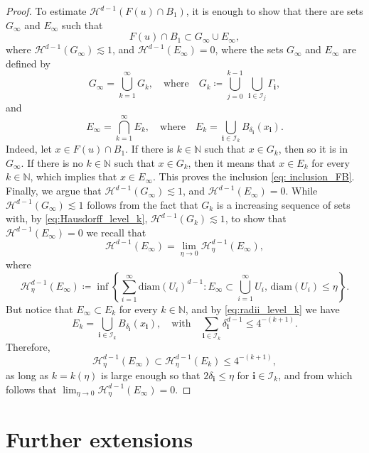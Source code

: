 \documentclass[reqno,11pt]{amsart}
\newcommand{\1}{\mathds{1}}  %
\numberwithin{equation}{section}
\begin{document}
\begin{proof}
To estimate $\mathcal H^{d-1}(F(u)\cap B_1)$, it is enough to show that there are sets $G_\infty$ and $E_\infty$ such that
\begin{equation}\label{eq: inclusion_FB}
    F(u) \cap B_1 \subset G_\infty \cup E_\infty,
\end{equation}
where $\mathcal{H}^{d-1}(G_\infty) \lesssim 1$, and $\mathcal{H}^{d-1}(E_\infty) = 0$, where the sets $G_\infty$ and $E_\infty$ are defined by
\[
    G_\infty = \bigcup_{k=1}^\infty G_k, \quad \text{where} \quad G_k \coloneqq \bigcup_{j=0}^{k-1}\ \bigcup_{\mathbf i\in\mathcal I_j}\Gamma_{\mathbf i},
\]
and
\[
    E_\infty = \bigcap_{k=1}^\infty E_k, \quad \text{where} \quad E_k = \bigcup_{\mathbf i\in\mathcal I_k} B_{\delta_{\mathbf i}}(x_{\mathbf i}). 
\]
Indeed, let $x \in F(u) \cap B_1$. If there is $k \in \mathbb{N}$ such that $x \in G_k$, then so it is in $G_\infty$. If there is no $k \in \mathbb{N}$ such that $x \in G_k$, then it means that $x \in E_k$ for every $k \in \mathbb{N}$, which implies that $x \in E_\infty$. This proves the inclusion \eqref{eq: inclusion_FB}. Finally, we argue that $\mathcal{H}^{d-1}(G_\infty) \lesssim 1$, and $\mathcal{H}^{d-1}(E_\infty) = 0$. While $\mathcal{H}^{d-1}(G_\infty) \lesssim 1$ follows from the fact that $G_k$ is a increasing sequence of sets with, by \eqref{eq:Hausdorff_level_k}, $\mathcal{H}^{d-1}(G_k) \lesssim 1$, to show that $\mathcal{H}^{d-1}(E_\infty) = 0$ we recall that
\[
   \mathcal{H}^{d-1}(E_\infty) = \lim_{\eta \to 0} \mathcal{H}_\eta^{d-1}(E_\infty), 
\]
where
\[
    \mathcal{H}_\eta^{d-1}(E_\infty) \coloneqq \inf \left\{\sum_{i=1}^{\infty} \mathrm{diam}(U_i)^{d-1} \colon E_\infty \subset \bigcup_{i=1}^\infty  U_i,\, \mathrm{diam}(U_i) \le \eta \right\}.
\]
But notice that $E_\infty \subset E_k$ for every $k \in \mathbb{N}$, and by \eqref{eq:radii_level_k} we have 
\[
   E_k = \bigcup_{\mathbf i\in\mathcal I_k} B_{\delta_{\mathbf i}}(x_{\mathbf i}), \quad \text{with} \quad \sum_{\mathbf i\in\mathcal I_k}\delta_{\mathbf i}^{d-1} \le 4^{-(k+1)}.
\]
Therefore,
\[
    \mathcal{H}_\eta^{d-1}(E_\infty) \subset \mathcal{H}_\eta^{d-1}(E_k) \le 4^{-(k+1)},
\]
as long as $k = k(\eta)$ is large enough so that $2\delta_{\mathbf i} \le \eta$ for ${\mathbf i} \in \mathcal{I}_k$, and from which follows that $\lim_{\eta \to 0} \mathcal{H}_\eta^{d-1}(E_\infty) = 0$.
\end{proof}

\section{Further extensions}\label{sct:some-extensions}
\end{document}
